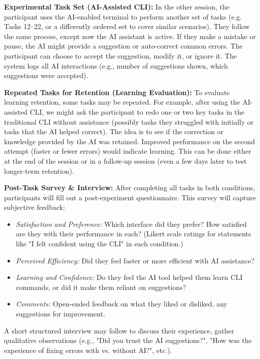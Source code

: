 \textbf{Experimental Task Set (AI-Assisted CLI):} In the other session, the participant uses the AI-enabled terminal to perform another set of tasks (e.g. Tasks 12–22, or a differently ordered set to cover similar scenarios). They follow the same process, except now the AI assistant is active. If they make a mistake or pause, the AI might provide a suggestion or auto-correct common errors. The participant can choose to accept the suggestion, modify it, or ignore it. The system logs all AI interactions (e.g., number of suggestions shown, which suggestions were accepted).

\textbf{Repeated Tasks for Retention (Learning Evaluation):} To evaluate learning retention, some tasks may be repeated. For example, after using the AI-assisted CLI, we might ask the participant to redo one or two key tasks in the traditional CLI without assistance (possibly tasks they struggled with initially or tasks that the AI helped correct). The idea is to see if the correction or knowledge provided by the AI was retained. Improved performance on the second attempt (faster or fewer errors) would indicate learning. This can be done either at the end of the session or in a follow-up session (even a few days later to test longer-term retention).

\textbf{Post-Task Survey \& Interview:} After completing all tasks in both conditions, participants will fill out a post-experiment questionnaire. This survey will capture subjective feedback:
\begin{itemize}
	\item \textit{Satisfaction and Preference:} Which interface did they prefer? How satisfied are they with their performance in each? (Likert scale ratings for statements like "I felt confident using the CLI" in each condition.)
	\item \textit{Perceived Efficiency:} Did they feel faster or more efficient with AI assistance?
	\item \textit{Learning and Confidence:} Do they feel the AI tool helped them learn CLI commands, or did it make them reliant on suggestions?
	\item \textit{Comments:} Open-ended feedback on what they liked or disliked, any suggestions for improvement.
\end{itemize}

A short structured interview may follow to discuss their experience, gather qualitative observations (e.g., "Did you trust the AI suggestions?", "How was the experience of fixing errors with vs. without AI?", etc.).

